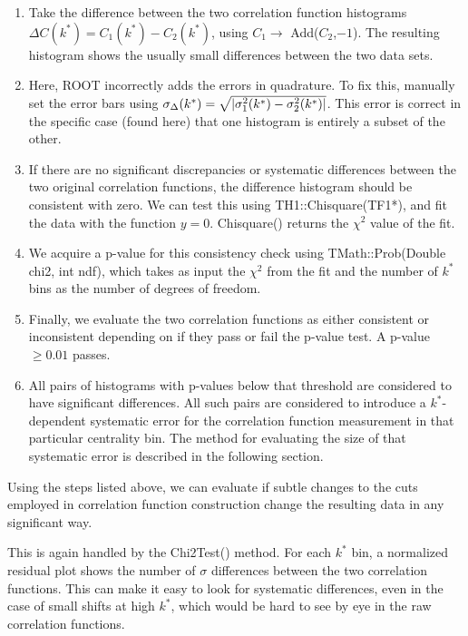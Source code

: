 \begin{enumerate}
\item Take the difference between the two correlation function histograms $\Delta C(k^*) = C_1(k^*) - C_2(k^*)$, using $C_1\rightarrow$ Add($C_2$,$-1$).  
The resulting histogram shows the usually small differences between the two data sets.
\item Here, ROOT incorrectly adds the errors in quadrature.  
To fix this, manually set the error bars using $\sigma_{\Delta}(k^*) = \sqrt{ \left\lvert \sigma_1^2(k^*) - \sigma_2^2(k^*) \right\rvert}$.  
This error is correct in the specific case (found here) that one histogram is entirely a subset of the other.
\item If there are no significant discrepancies or systematic differences between the two original correlation functions, the difference histogram should be consistent with zero.  
We can test this using TH1::Chisquare(TF1*), and fit the data with the function $y=0$.  
Chisquare() returns the $\chi^2$ value of the fit.
\item We acquire a p-value for this consistency check using TMath::Prob(Double chi2, int ndf), which takes as input the $\chi^2$ from the fit and the number of $k^*$ bins as the number of degrees of freedom.  
\item Finally, we evaluate the two correlation functions as either consistent or inconsistent depending on if they pass or fail the p-value test.  
A p-value $\geq 0.01$ passes.  
\item All pairs of histograms with p-values below that threshold are considered to have significant differences.  
All such pairs are considered to introduce a $k^*$-dependent systematic error for the correlation function measurement in that particular centrality bin.  
The method for evaluating the size of that systematic error is described in the following section.
\end{enumerate}

Using the steps listed above, we can evaluate if subtle changes to the cuts employed in correlation function construction change the resulting data in any significant way.  

This is again handled by the Chi2Test() method.  
For each $k^*$ bin, a normalized residual plot shows the number of $\sigma$ differences between the two correlation functions.  
This can make it easy to look for systematic differences, even in the case of small shifts at high $k^*$, which would be hard to see by eye in the raw correlation functions.

